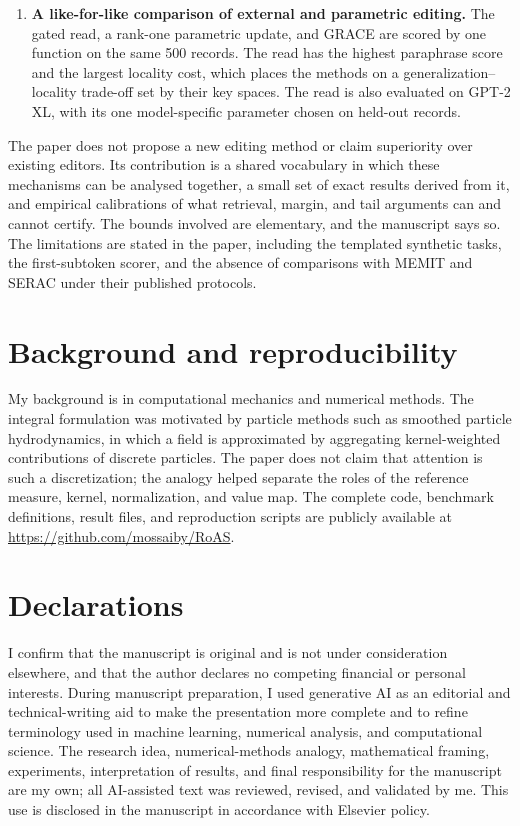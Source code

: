 \documentclass[11pt]{article}
\begin{document}
\begin{enumerate}[leftmargin=*]
\item \textbf{A like-for-like comparison of external and parametric editing.} The gated read, a rank-one parametric update, and GRACE are scored by one function on the same 500 records. The read has the highest paraphrase score and the largest locality cost, which places the methods on a generalization--locality trade-off set by their key spaces. The read is also evaluated on GPT-2 XL, with its one model-specific parameter chosen on held-out records.
\end{enumerate}

The paper does not propose a new editing method or claim superiority over existing editors. Its contribution is a shared vocabulary in which these mechanisms can be analysed together, a small set of exact results derived from it, and empirical calibrations of what retrieval, margin, and tail arguments can and cannot certify. The bounds involved are elementary, and the manuscript says so. The limitations are stated in the paper, including the templated synthetic tasks, the first-subtoken scorer, and the absence of comparisons with MEMIT and SERAC under their published protocols.

\section*{Background and reproducibility}

My background is in computational mechanics and numerical methods. The integral formulation was motivated by particle methods such as smoothed particle hydrodynamics, in which a field is approximated by aggregating kernel-weighted contributions of discrete particles. The paper does not claim that attention is such a discretization; the analogy helped separate the roles of the reference measure, kernel, normalization, and value map. The complete code, benchmark definitions, result files, and reproduction scripts are publicly available at \url{https://github.com/mossaiby/RoAS}.

\section*{Declarations}

I confirm that the manuscript is original and is not under consideration elsewhere, and that the author declares no competing financial or personal interests. During manuscript preparation, I used generative AI as an editorial and technical-writing aid to make the presentation more complete and to refine terminology used in machine learning, numerical analysis, and computational science. The research idea, numerical-methods analogy, mathematical framing, experiments, interpretation of results, and final responsibility for the manuscript are my own; all AI-assisted text was reviewed, revised, and validated by me. This use is disclosed in the manuscript in accordance with Elsevier policy.
\end{document}
